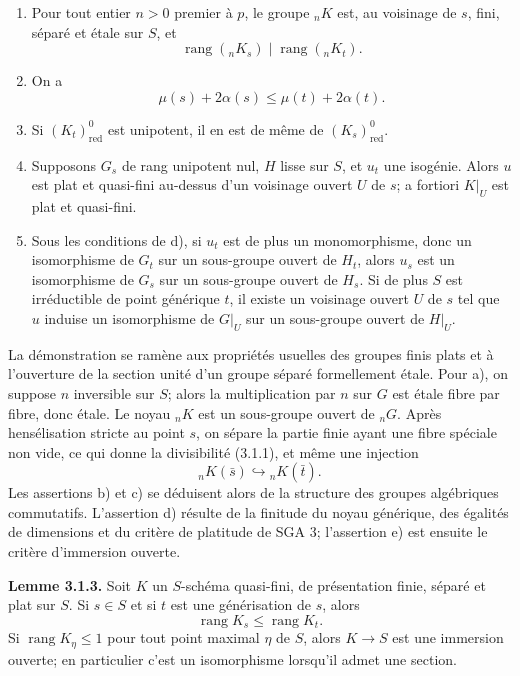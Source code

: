 \documentclass[11pt]{article}
\providecommand{\rang}{\operatorname{rang}}
\begin{document}
\begin{enumerate}[label=\alph*)]
\item Pour tout entier \(n>0\) premier à \(p\), le groupe \({}_nK\) est, au voisinage de \(s\), fini, séparé et étale sur \(S\), et
\begin{equation}\tag{3.1.1}
        \rang({}_nK_s)\mid \rang({}_nK_t).
\end{equation}
\item On a
\begin{equation}\tag{3.1.2}
        \mu(s)+2\alpha(s)\leq \mu(t)+2\alpha(t).
\end{equation}
\item Si \((K_t)^0_{\mathrm{red}}\) est unipotent, il en est de même de \((K_s)^0_{\mathrm{red}}\).
\item Supposons \(G_s\) de rang unipotent nul, \(H\) lisse sur \(S\), et \(u_t\) une isogénie.  Alors \(u\) est plat et quasi-fini au-dessus d'un voisinage ouvert \(U\) de \(s\); a fortiori \(K|_U\) est plat et quasi-fini.
\item Sous les conditions de d), si \(u_t\) est de plus un monomorphisme, donc un isomorphisme de \(G_t\) sur un sous-groupe ouvert de \(H_t\), alors \(u_s\) est un isomorphisme de \(G_s\) sur un sous-groupe ouvert de \(H_s\).  Si de plus \(S\) est irréductible de point générique \(t\), il existe un voisinage ouvert \(U\) de \(s\) tel que \(u\) induise un isomorphisme de \(G|_U\) sur un sous-groupe ouvert de \(H|_U\).
\end{enumerate}

La démonstration se ramène aux propriétés usuelles des groupes finis plats et à l'ouverture de la section unité d'un groupe séparé formellement étale.  Pour a), on suppose \(n\) inversible sur \(S\); alors la multiplication par \(n\) sur \(G\) est étale fibre par fibre, donc étale.  Le noyau \({}_nK\) est un sous-groupe ouvert de \({}_nG\).  Après hensélisation stricte au point \(s\), on sépare la partie finie ayant une fibre spéciale non vide, ce qui donne la divisibilité (3.1.1), et même une injection
\[
        {}_nK(\bar s)\hookrightarrow {}_nK(\bar t).
\]
Les assertions b) et c) se déduisent alors de la structure des groupes algébriques commutatifs.  L'assertion d) résulte de la finitude du noyau générique, des égalités de dimensions et du critère de platitude de SGA 3; l'assertion e) est ensuite le critère d'immersion ouverte.

\textbf{Lemme 3.1.3.} Soit \(K\) un \(S\)-schéma quasi-fini, de présentation finie, séparé et plat sur \(S\).  Si \(s\in S\) et si \(t\) est une générisation de \(s\), alors
\[
        \rang K_s\leq \rang K_t.
\]
Si \(\rang K_\eta\leq 1\) pour tout point maximal \(\eta\) de \(S\), alors \(K\to S\) est une immersion ouverte; en particulier c'est un isomorphisme lorsqu'il admet une section.
\end{document}
